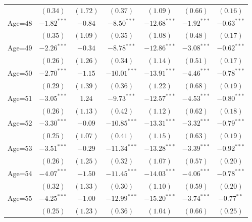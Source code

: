 \documentclass[fullpage]{paper}
\begin{document}
\begin{center}
\begin{longtable}{l c c c c c c }
            & $(0.34)$      & $(1.72)$      & $(0.37)$       & $(1.09)$       & $(0.66)$      & $(0.16)$      \\
Age=48      & $-1.82^{***}$ & $-0.84$       & $-8.50^{***}$  & $-12.68^{***}$ & $-1.92^{***}$ & $-0.63^{***}$ \\
            & $(0.35)$      & $(1.09)$      & $(0.35)$       & $(1.08)$       & $(0.48)$      & $(0.17)$      \\
Age=49      & $-2.26^{***}$ & $-0.34$       & $-8.78^{***}$  & $-12.86^{***}$ & $-3.08^{***}$ & $-0.62^{***}$ \\
            & $(0.26)$      & $(1.26)$      & $(0.34)$       & $(1.14)$       & $(0.51)$      & $(0.17)$      \\
Age=50      & $-2.70^{***}$ & $-1.15$       & $-10.01^{***}$ & $-13.91^{***}$ & $-4.46^{***}$ & $-0.78^{***}$ \\
            & $(0.29)$      & $(1.39)$      & $(0.36)$       & $(1.22)$       & $(0.68)$      & $(0.19)$      \\
Age=51      & $-3.05^{***}$ & $1.24$        & $-9.73^{***}$  & $-12.57^{***}$ & $-4.53^{***}$ & $-0.80^{***}$ \\
            & $(0.26)$      & $(1.13)$      & $(0.42)$       & $(1.12)$       & $(0.62)$      & $(0.18)$      \\
Age=52      & $-3.30^{***}$ & $-0.09$       & $-10.85^{***}$ & $-13.31^{***}$ & $-3.32^{***}$ & $-0.79^{***}$ \\
            & $(0.25)$      & $(1.07)$      & $(0.41)$       & $(1.15)$       & $(0.63)$      & $(0.19)$      \\
Age=53      & $-3.51^{***}$ & $-0.29$       & $-11.34^{***}$ & $-13.28^{***}$ & $-3.39^{***}$ & $-0.92^{***}$ \\
            & $(0.26)$      & $(1.25)$      & $(0.32)$       & $(1.07)$       & $(0.57)$      & $(0.20)$      \\
Age=54      & $-4.07^{***}$ & $-1.50$       & $-11.45^{***}$ & $-14.03^{***}$ & $-4.06^{***}$ & $-0.78^{***}$ \\
            & $(0.32)$      & $(1.33)$      & $(0.30)$       & $(1.10)$       & $(0.59)$      & $(0.20)$      \\
Age=55      & $-4.25^{***}$ & $-1.00$       & $-12.99^{***}$ & $-15.20^{***}$ & $-3.74^{***}$ & $-0.77^{**}$  \\
            & $(0.25)$      & $(1.23)$      & $(0.36)$       & $(1.04)$       & $(0.66)$      & $(0.25)$      \\

\end{longtable}
\end{center}
\end{document}

